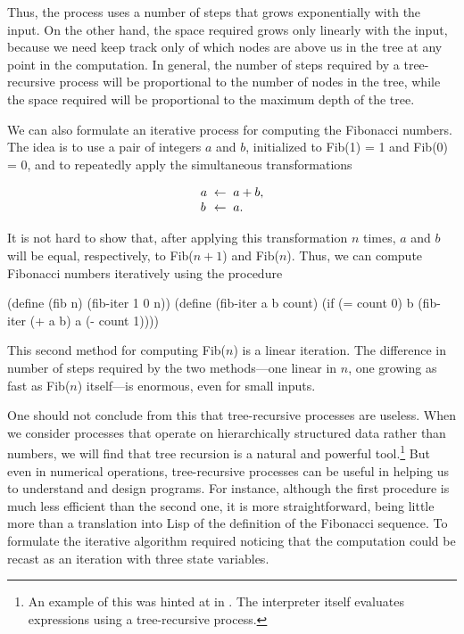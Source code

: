 \noindent
Thus, the process uses a number of steps that grows exponentially with the
input.  On the other hand, the space required grows only linearly with the
input, because we need keep track only of which nodes are above us in the tree
at any point in the computation.  In general, the number of steps required by a
tree-recursive process will be proportional to the number of nodes in the tree,
while the space required will be proportional to the maximum depth of the tree.

We can also formulate an iterative process for computing the Fibonacci numbers.
The idea is to use a pair of integers \( a \) and \( b \), initialized to
Fib(1) = 1 and Fib(0) = 0, and to repeatedly apply the
simultaneous transformations

$$
\begin{array}{l@{\;\;\gets\;\;}l}
  a & a + b, \\
  b & a.
\end{array}
$$

\noindent
It is not hard to show that, after applying this transformation \( n \) times,
\( a \) and \( b \) will be equal, respectively, to Fib(\( n+1 \)) and
Fib(\( n \)).  Thus, we can compute Fibonacci numbers iteratively using
the procedure

\begin{codeBlock}
(define (fib n)
  (fib-iter 1 0 n))
(define (fib-iter a b count)
  (if (= count 0)
      b
      (fib-iter (+ a b) a (- count 1))))
\end{codeBlock}

\noindent
This second method for computing Fib(\( n \)) is a linear iteration.  The
difference in number of steps required by the two methods---one linear in
\( n \), one growing as fast as Fib(\( n \)) itself---is enormous, even for
small inputs.

One should not conclude from this that tree-recursive processes are useless.
When we consider processes that operate on hierarchically structured data
rather than numbers, we will find that tree recursion is a natural and powerful
tool.\footnote{An example of this was hinted at in . The
interpreter itself evaluates expressions using a tree-recursive process.} But
even in numerical operations, tree-recursive processes can be useful in helping
us to understand and design programs.  For instance, although the first
 procedure is much less efficient than the second one, it is more
straightforward, being little more than a translation into Lisp of the
definition of the Fibonacci sequence.  To formulate the iterative algorithm
required noticing that the computation could be recast as an iteration with
three state variables.

